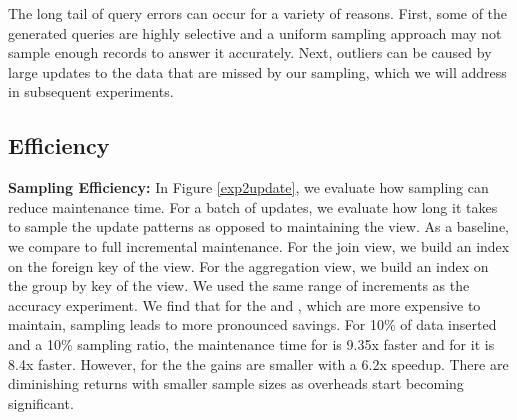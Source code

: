 The long tail of query errors can occur for a variety of reasons.
First, some of the generated queries are highly selective and a uniform sampling approach may not sample enough records to answer it accurately.
Next, outliers can be caused by large updates to the data that are missed by our sampling, which we will address in subsequent experiments.

\subsection{Efficiency}

{\noindent \bf Sampling Efficiency: }
In Figure \ref{exp2update}, we evaluate how sampling can reduce maintenance time.
For a batch of updates, we evaluate how long it takes to sample the update patterns as opposed to maintaining the view.
As a baseline, we compare to full incremental maintenance.
For the join view, we build an index on the foreign key of the view.
For the aggregation view, we build an index on the group by key of the view.
We used the same range of increments as the accuracy experiment.
We find that for the \aggview and \fjview, which are more expensive to maintain, sampling leads to more pronounced savings. 
For 10\% of data inserted and a 10\% sampling ratio, the maintenance time for \fjview  is 9.35x faster and for \aggview it is 8.4x faster.
However, for the \spview the gains are smaller with a 6.2x speedup.
There are diminishing returns with smaller sample sizes as overheads start becoming significant. 

